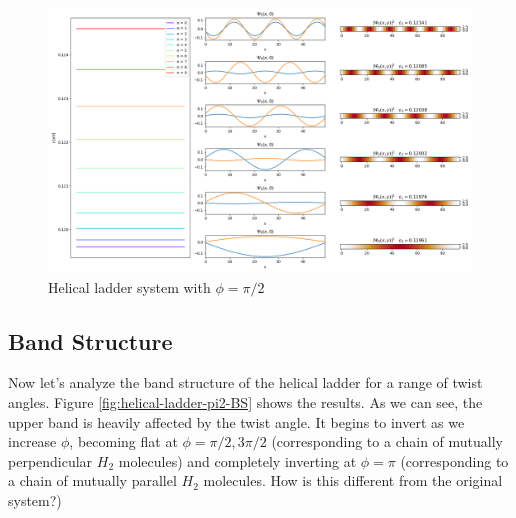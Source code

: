 \documentclass{article}
\begin{document}
\begin{figure}[h]
    \includegraphics[width = \linewidth]{./figures/spec-wave_a1b1p2_u5t1v1w1.png}
    \caption{Helical ladder system with $\phi = \pi/2$}
    \label{fig:helical-ladder-pi2}
\end{figure}

\subsection{Band Structure}
Now let's analyze the band structure of the helical ladder for a range of twist angles. Figure \ref{fig:helical-ladder-pi2-BS} shows the results. As we can see, the upper band is heavily affected by the twist angle. It begins to invert as we increase $\phi$, becoming flat at $\phi = \pi/2, 3\pi/2$ (corresponding to a chain of  mutually perpendicular $H_2$ molecules) and completely inverting at $\phi = \pi$ (corresponding to a chain of mutually parallel $H_2$ molecules. How is this different from the original system?)
\end{document}
